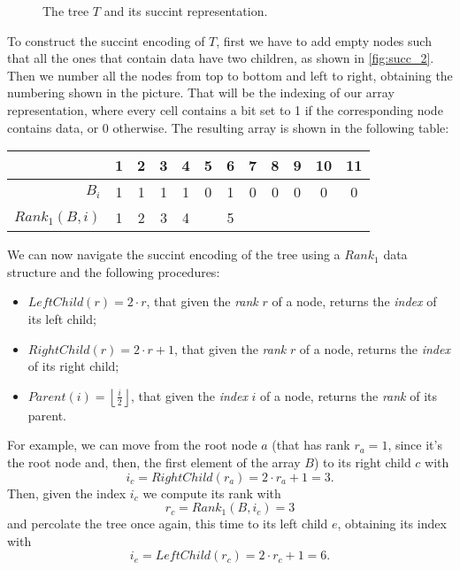 \begin{figure}[H]
\caption{The tree $T$ and its succint representation.}
\label{fig:succ_0}
\end{figure}

To construct the succint encoding of $T$, first we have to add empty nodes such
that all the ones that contain data have two children, as shown in
\autoref{fig:succ_2}. Then we number all the nodes from top to bottom and left
to right, obtaining the numbering shown in the picture. That will be the
indexing of our array representation, where every cell contains a bit set to 1
if the corresponding node contains data, or 0 otherwise. The resulting array is
shown in the following table:
%
\begin{table}[H]
  \centering
  \begin{tabular}{r|c|c|c|c|c|c|c|c|c|c|c}
                   & 1 & 2 & 3 & 4 & 5 & 6 & 7 & 8 & 9 & 10 & 11 \\ \hline
    $B_i$          & 1 & 1 & 1 & 1 & 0 & 1 & 0 & 0 & 0 &  0 &  0 \\
    $Rank_1(B, i)$ & 1 & 2 & 3 & 4 &   & 5 &   &   &   &    &    \\
  \end{tabular}
\end{table}

We can now navigate the succint encoding of the tree using a $Rank_1$ data
structure and the following procedures:
%
\begin{itemize}

  \item $LeftChild(r) = 2 \cdot r$, that given the \emph{rank} $r$ of a node, returns
  the \emph{index} of its left child;

  \item $RightChild(r) = 2 \cdot r + 1$, that given the \emph{rank} $r$ of a node,
  returns the \emph{index} of its right child;

  \item $Parent(i) = \left\lfloor \frac{i}{2} \right\rfloor$, that given the
  \emph{index} $i$ of a node, returns the \emph{rank} of its parent.

\end{itemize}

For example, we can move from the root node $a$ (that has rank $r_a = 1$, since
it's the root node and, then, the first element of the array $B$) to its right
child $c$ with $$i_c = RightChild(r_a) = 2 \cdot r_a + 1 = 3.$$ Then, given the
index $i_c$ we compute its rank with $$r_c = Rank_1(B, i_c) = 3$$ and percolate
the tree once again, this time to its left child $e$, obtaining its index with
$$i_e = LeftChild(r_c) = 2 \cdot r_c + 1 = 6.$$
